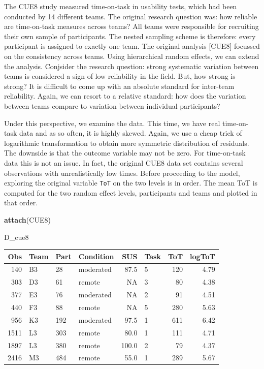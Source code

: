 \documentclass[]{svmono}
\newenvironment{Shaded}{\begin{snugshade}}{\end{snugshade}}
\newcommand{\KeywordTok}[1]{\textcolor[rgb]{0.13,0.29,0.53}{\textbf{#1}}}
\newcommand{\NormalTok}[1]{#1}
\theoremstyle{definition}
\theoremstyle{definition}
\theoremstyle{definition}
\theoremstyle{remark}
\begin{document}
The CUE8 study measured time-on-task in usability tests, which had been
conducted by 14 different teams. The original research question was: how
reliable are time-on-task measures across teams? All teams were
responsible for recruiting their own sample of participants. The nested
sampling scheme is therefore: every participant is assigned to exactly
one team. The original analysis {[}CUE8{]} focussed on the consistency
across teams. Using hierarchical random effects, we can extend the
analysis. Conjsider the research question: strong systematic variation
between teams is considered a sign of low reliability in the field. But,
how strong is strong? It is difficult to come up with an absolute
standard for inter-team reliability. Again, we can resort to a relative
standard: how does the variation between teams compare to variation
between individual participants?

Under this perspective, we examine the data. This time, we have real
time-on-task data and as so often, it is highly skewed. Again, we use a
cheap trick of logarithmic transformation to obtain more symmetric
distribution of residuals. The downside is that the outcome variable may
not be zero. For time-on-task data this is not an issue. In fact, the
original CUE8 data set contains several observations with
unrealistically low times. Before proceeding to the model, exploring the
original variable \texttt{ToT} on the two levels is in order. The mean
ToT is computed for the two random effect levels, participants and teams
and plotted in that order.

\begin{Shaded}
\begin{Highlighting}[]
\KeywordTok{attach}\NormalTok{(CUE8)}

\NormalTok{D_cue8}
\end{Highlighting}
\end{Shaded}

\begin{longtable}[]{@{}rlllrlrr@{}}
\toprule
Obs & Team & Part & Condition & SUS & Task & ToT & logToT\tabularnewline
\midrule
\endhead
140 & B3 & 28 & moderated & 87.5 & 5 & 120 & 4.79\tabularnewline
303 & D3 & 61 & remote & NA & 3 & 80 & 4.38\tabularnewline
377 & E3 & 76 & moderated & NA & 2 & 91 & 4.51\tabularnewline
440 & F3 & 88 & remote & NA & 5 & 280 & 5.63\tabularnewline
956 & K3 & 192 & moderated & 97.5 & 1 & 611 & 6.42\tabularnewline
1511 & L3 & 303 & remote & 80.0 & 1 & 111 & 4.71\tabularnewline
1897 & L3 & 380 & remote & 100.0 & 2 & 79 & 4.37\tabularnewline
2416 & M3 & 484 & remote & 55.0 & 1 & 289 & 5.67\tabularnewline
\bottomrule
\end{longtable}
\end{document}
